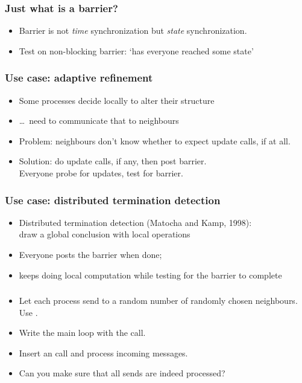 
\begin{frame}[containsverbatim]\frametitle{Just what is a barrier?}
\begin{itemize}
\item Barrier is not \emph{time} synchronization but \emph{state}
  synchronization.
\item Test on non-blocking barrier: `has everyone reached some
  state'
\end{itemize}
\end{frame}

\begin{frame}[containsverbatim]\frametitle{Use case: adaptive refinement}
\begin{itemize}
\item Some processes decide locally to alter their structure
\item \ldots~need to communicate that to neighbours
\item Problem: neighbours don't know whether to expect update calls,
  if at all.
\item Solution: do update calls, if any, then post barrier.\\
  Everyone probe for updates, test for barrier.
\end{itemize}
\end{frame}

\begin{frame}\frametitle{Use case: distributed termination detection}
\begin{itemize}
\item Distributed termination detection (Matocha and Kamp, 1998):\\
  draw a global conclusion with local operations
\item Everyone posts the barrier when done;
\item keeps doing local computation while testing for the barrier to
  complete
\end{itemize}
\end{frame}


\begin{frame}[containsverbatim]\frametitle{}
\end{frame}

\begin{exerciseframe}[ibarrierupdate]
\begin{itemize}
\item Let each process send to a random number of randomly chosen
  neighbours. Use .
\item Write the main loop with the  call.
\item Insert an  call and process incoming messages.
\item Can you make sure that all sends are indeed processed?
\end{itemize}
\end{exerciseframe}

